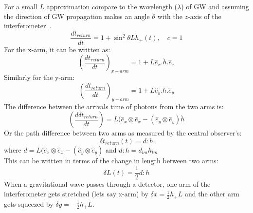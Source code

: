 \documentclass{ttuthes2007}
\begin{document}
For a small $L$ approximation compare to the wavelength ($\lambda$) of \ac{GW}
and assuming the
direction of \ac{GW} propagation makes an angle $\theta$ with the $z$-axis of
the interferometer~\cite{Sathyaprakash_2009}.
\begin{equation}
\frac{dt_{return}}{dt} =1+\sin^2{\theta} L \dot{h}_+ (t), \quad c=1 
\end{equation}
For the x-arm, it can be written as:
\begin{equation}
\left(\frac{dt_{return}}{dt}\right)_{x-arm}=1+L\hat{e}_x.\dot{h}.\hat{e}_x
\end{equation}
Similarly for the y-arm:
\begin{equation}                                                                
\left(\frac{dt_{return}}{dt}\right)_{y-arm}=1+L\hat{e}_y.\dot{h}.\hat{e}_y  
\end{equation}  
The difference between the arrivals time of photons from the two arms is:
\begin{equation}
\left(\frac{d\delta t_{return}}{dt}\right)=L(\hat{e}_x\otimes\hat{e}_x-(\hat{e}_y\otimes\hat{e}_y)\dot{h}
\end{equation}
Or the path difference between two arms as measured by the central observer's:
\begin{equation}
\delta t_{return}(t)=d:h
\end{equation}
where $d=L(\hat{e}_x\otimes\hat{e}_x-(\hat{e}_y\otimes\hat{e}_y)$ and 
$d:h=d_{lm}h_{lm}$
\\
This can be written in terms of the change in length between two arms:
\begin{equation}
\delta L(t)=\frac{1}{2}d:h 
\end{equation}
When a gravitational wave passes through a detector, one arm of the
interferometer gets stretched (lets say x-arm) by $\delta x=\frac{1}{2}h_+L$ and
the other arm gets squeezed by $\delta y=-\frac{1}{2}h_+L$.    
\end{document}
